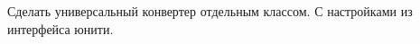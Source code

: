 
\begin{DoxyRefList}
\item[Класс \mbox{\hyperlink{class_color_changer}{Color\+Changer}} ]\label{todo__todo000001}%
%
Сделать универсальный конвертер отдельным классом. С настройками из интерфейса юнити. 
\end{DoxyRefList}